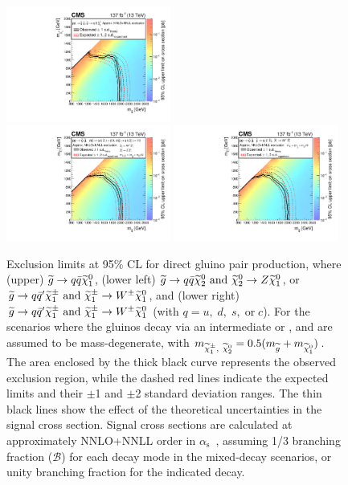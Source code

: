 \begin{figure}[htbp]
  \centering
    \includegraphics[width=0.48\textwidth]{figs/results/T1qqqqXSEC.pdf}\\
    \includegraphics[width=0.48\textwidth]{figs/results/T5qqqqVVXSEC.pdf}
    \includegraphics[width=0.48\textwidth]{figs/results/T5qqqqWWXSEC.pdf}
    \caption{
    Exclusion limits at  95\% CL for direct gluino pair production,
    where (upper) ${\widetilde{g}} \to q\bar{q}{\widetilde{\chi}_1^0}$, (lower left) ${\widetilde{g}} \to q\bar{q}\widetilde{\chi}_2^0~\mathrm{and}~\widetilde{\chi}_2^0 \to Z{\widetilde{\chi}_1^0}$, or ${\widetilde{g}} \to q\bar{q}'\widetilde{\chi}_1^\pm~\mathrm{and}~\widetilde{\chi}_1^\pm \to W^\pm{\widetilde{\chi}_1^0}$, and
    (lower right) ${\widetilde{g}} \to q\bar{q}'\widetilde{\chi}_1^\pm~\mathrm{and}~\widetilde{\chi}_1^\pm \to W^\pm{\widetilde{\chi}_1^0}$ (with $q=u,\;d,\;s,\;\text{or}\;c$).
    For the scenarios where the gluinos decay via an intermediate \chizz or \chargino, \chizz and \chargino are assumed to be mass-degenerate, with
     $m_{\widetilde{\chi}_1^\pm,~\widetilde{\chi}_2^0}=0.5(m_{{\widetilde{g}}}+m_{{\widetilde{\chi}_1^0}})$.
      The area enclosed by the thick black curve represents the observed exclusion region,
      while the dashed red lines indicate the expected limits and
      their $\pm$1 and $\pm$2 standard deviation ranges.
      The thin black lines show the effect of the theoretical
      uncertainties in the signal cross section.
      Signal cross sections are calculated at approximately NNLO+NNLL order in $\alpha_{\mathrm{s}}$~\cite{Beenakker:nnll},
      assuming 1/3
      branching fraction ($\mathcal{B}$) for each decay mode in the mixed-decay scenarios, or unity branching fraction for the indicated decay.}
    \label{fig:t5x}
\end{figure}

